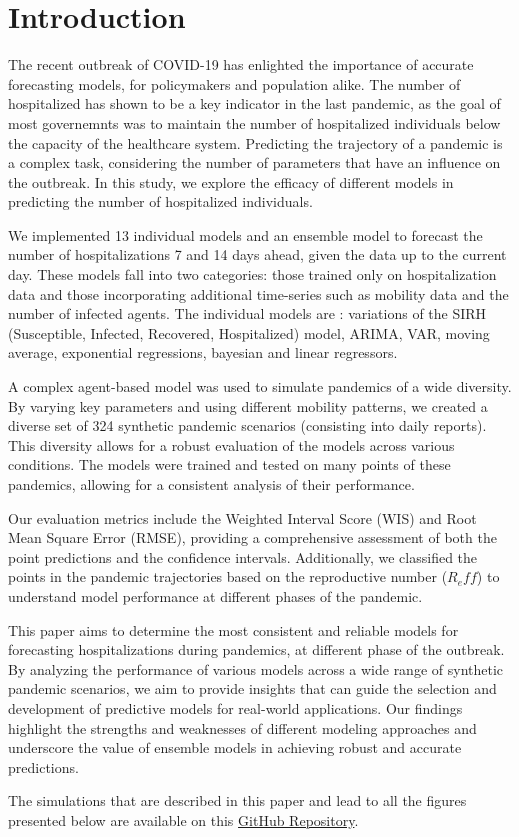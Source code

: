 \section{Introduction}

The recent outbreak of COVID-19 has enlighted the importance of accurate forecasting models, for policymakers and population alike. 
The number of hospitalized has shown to be a key indicator in the last pandemic, as the goal of most governemnts was to maintain the number of hospitalized individuals below the capacity of the healthcare system.
Predicting the trajectory of a pandemic is a complex task, considering the number of parameters that have an influence on the outbreak. 
In this study, we explore the efficacy of different models in predicting the number of hospitalized individuals. 

We implemented 13 individual models and an ensemble model to forecast the number of hospitalizations 7 and 14 days ahead, given the data up to the current day.
These models fall into two categories: those trained only on hospitalization data and those incorporating additional time-series such as mobility data and the number of infected agents. 
The individual models are : variations of the SIRH (Susceptible, Infected, Recovered, Hospitalized) model, ARIMA, VAR, moving average, exponential regressions, bayesian and linear regressors.

A complex agent-based model was used to simulate pandemics of a wide diversity. 
By varying key parameters and using different mobility patterns, we created a diverse set of 324 synthetic pandemic scenarios (consisting into daily reports). 
This diversity allows for a robust evaluation of the models across various conditions.
The models were trained and tested on many points of these pandemics, allowing for a consistent analysis of their performance. 

Our evaluation metrics include the Weighted Interval Score (WIS) and Root Mean Square Error (RMSE), providing a comprehensive assessment of both the point predictions and the confidence intervals. 
Additionally, we classified the points in the pandemic trajectories based on the reproductive number ($R_eff$) to understand model performance at different phases of the pandemic.

This paper aims to determine the most consistent and reliable models for forecasting hospitalizations during pandemics, at different phase of the outbreak. 
By analyzing the performance of various models across a wide range of synthetic pandemic scenarios, we aim to provide insights that can guide the selection and development of predictive models for real-world applications. 
Our findings highlight the strengths and weaknesses of different modeling approaches and underscore the value of ensemble models in achieving robust and accurate predictions.

The simulations that are described in this paper and lead to all the figures presented below are available on this  \href{https://github.com/gregoirebechade/covid_internship}{GitHub Repository}\label{github-link}.
